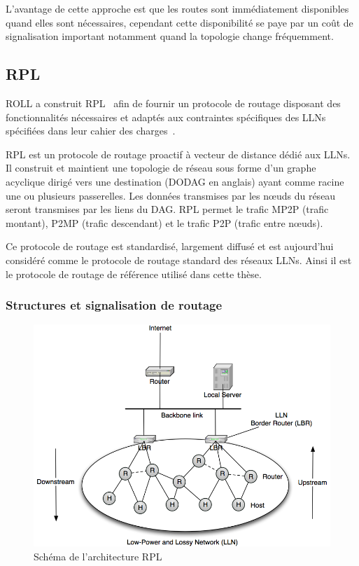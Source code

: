 L'avantage de cette approche est que les routes sont immédiatement disponibles quand elles sont nécessaires, cependant cette disponibilité se paye par un coût de signalisation important notamment quand la topologie change fréquemment.

\subsection{\acl{RPL}}

\ac{ROLL} a construit \ac{RPL}~\cite{rfc6550} afin de fournir un protocole de routage disposant des fonctionnalités nécessaires et adaptés aux contraintes spécifiques des \ac{LLN}s spécifiées dans leur cahier des charges~\cite{draft-ietf-roll-protocols-survey-07}.

\ac{RPL} est un protocole de routage proactif à vecteur de distance dédié aux \ac{LLN}s.
Il construit et maintient une topologie de réseau sous forme d’un graphe acyclique dirigé vers une destination (\ac{DODAG} en anglais) ayant comme racine une ou plusieurs passerelles.
Les données transmises par les nœuds du réseau seront transmises par les liens du \ac{DAG}.
\ac{RPL} permet le trafic \ac{MP2P} (trafic montant), \ac{P2MP} (trafic descendant) et le trafic \ac{P2P} (trafic entre nœuds).

Ce protocole de routage est standardisé, largement diffusé et est aujourd'hui considéré comme le protocole de routage standard des réseaux \ac{LLN}s.
Ainsi il est le protocole de routage de référence utilisé dans cette thèse.

\subsubsection{Structures et signalisation de routage}

\begin{figure}[ht]
	\centering
	\includegraphics[width=.7\textwidth]{img/rpl.png}
	\caption{Schéma de l'architecture \ac{RPL}}
	\label{gw:fig:rpl_architecture}
\end{figure}

